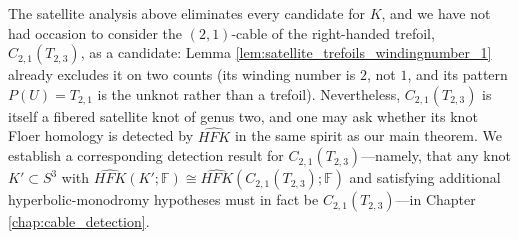\begin{remark}
The satellite analysis above eliminates every candidate for $K$, and we have not had occasion to consider the $(2,1)$-cable of the right-handed trefoil, $C_{2,1}(T_{2,3})$, as a candidate: Lemma \ref{lem:satellite_trefoils_windingnumber_1} already excludes it on two counts (its winding number is $2$, not $1$, and its pattern $P(U) = T_{2,1}$ is the unknot rather than a trefoil). Nevertheless, $C_{2,1}(T_{2,3})$ is itself a fibered satellite knot of genus two, and one may ask whether its knot Floer homology is detected by $\widehat{HFK}$ in the same spirit as our main theorem. We establish a corresponding detection result for $C_{2,1}(T_{2,3})$---namely, that any knot $K' \subset S^3$ with $\widehat{HFK}(K'; \mathbb{F}) \cong \widehat{HFK}(C_{2,1}(T_{2,3}); \mathbb{F})$ and satisfying additional hyperbolic-monodromy hypotheses must in fact be $C_{2,1}(T_{2,3})$---in Chapter \ref{chap:cable_detection}.
\end{remark}
